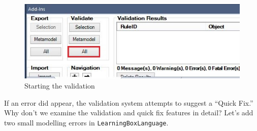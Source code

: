 \begin{stepbystep}
\begin{figure}[htbp]
	\centering
  \includegraphics[width=1.0\textwidth]{../../org.moflon.doc.handbook.02_leitnersLearningBox/2_staticSemantics/5_validation/images/ea_startValidation}
	\caption{Starting the validation}
	\label{ea:validation_menu}
\end{figure}
\FloatBarrier
\end{stepbystep}

If an error did appear, the validation system attempts to suggest a ``Quick Fix.'' Why don't we examine the validation and quick fix features in detail? Let's
add two small modelling errors in \texttt{LearningBoxLanguage}.


